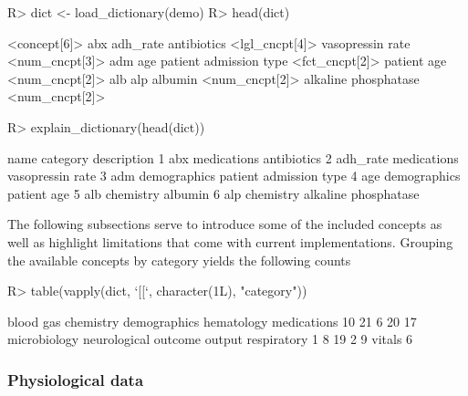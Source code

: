 \documentclass[
  notitle,
  nojss,
  noheadings]{jss}
\begin{document}
\begin{CodeChunk}
\begin{CodeInput}
R> dict <- load_dictionary(demo)
R> head(dict)
\end{CodeInput}
\begin{CodeOutput}
<concept[6]>
                                  abx                              adh_rate 
           antibiotics <lgl_cncpt[4]>       vasopressin rate <num_cncpt[3]> 
                                  adm                                   age 
patient admission type <fct_cncpt[2]>            patient age <num_cncpt[2]> 
                                  alb                                   alp 
               albumin <num_cncpt[2]>   alkaline phosphatase <num_cncpt[2]> 
\end{CodeOutput}
\begin{CodeInput}
R> explain_dictionary(head(dict))
\end{CodeInput}
\begin{CodeOutput}
      name     category            description
1      abx  medications            antibiotics
2 adh_rate  medications       vasopressin rate
3      adm demographics patient admission type
4      age demographics            patient age
5      alb    chemistry                albumin
6      alp    chemistry   alkaline phosphatase
\end{CodeOutput}
\end{CodeChunk}

The following subsections serve to introduce some of the included
concepts as well as highlight limitations that come with current
implementations. Grouping the available concepts by category yields the
following counts

\begin{CodeChunk}
\begin{CodeInput}
R> table(vapply(dict, `[[`, character(1L), "category"))
\end{CodeInput}
\begin{CodeOutput}

   blood gas    chemistry demographics   hematology  medications 
          10           21            6           20           17 
microbiology neurological      outcome       output  respiratory 
           1            8           19            2            9 
      vitals 
           6 
\end{CodeOutput}
\end{CodeChunk}

\hypertarget{physiological-data}{%
\subsubsection{Physiological data}\label{physiological-data}}
\end{document}
